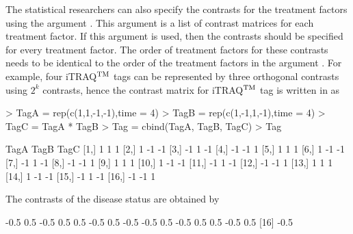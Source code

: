 \documentclass[article]{jss}
\begin{document}
The statistical researchers can also specify the contrasts for the treatment factors using the argument . This argument  is a list of contrast matrices for each treatment factor. If this argument is used, then the contrasts should be specified for every treatment factor. The order of treatment factors for these contrasts needs to be identical to the order of the treatment factors in the argument . For example, four iTRAQ$^{\rm TM}$ tags can be represented by three orthogonal contrasts using $2^k$ contrasts, hence the contrast matrix for iTRAQ$^{\rm TM}$ tag is written in  as
\begin{CodeChunk}
\begin{CodeInput}
> TagA = rep(c(1,1,-1,-1),time = 4)                
> TagB = rep(c(1,-1,1,-1),time = 4)                
> TagC = TagA * TagB
> Tag = cbind(TagA, TagB, TagC)
> Tag
\end{CodeInput}
\begin{CodeOutput}
      TagA TagB TagC
 [1,]    1    1    1
 [2,]    1   -1   -1
 [3,]   -1    1   -1
 [4,]   -1   -1    1
 [5,]    1    1    1
 [6,]    1   -1   -1
 [7,]   -1    1   -1
 [8,]   -1   -1    1
 [9,]    1    1    1
[10,]    1   -1   -1
[11,]   -1    1   -1
[12,]   -1   -1    1
[13,]    1    1    1
[14,]    1   -1   -1
[15,]   -1    1   -1
[16,]   -1   -1    1
\end{CodeOutput}
\end{CodeChunk}
The contrasts of the disease status are obtained by 
\begin{CodeChunk}
\begin{CodeOutput}
 [1] -0.5  0.5 -0.5  0.5  0.5 -0.5  0.5 -0.5 -0.5  0.5 -0.5  0.5  0.5 -0.5  0.5
[16] -0.5
\end{CodeOutput}
\end{CodeChunk}
\end{document}
